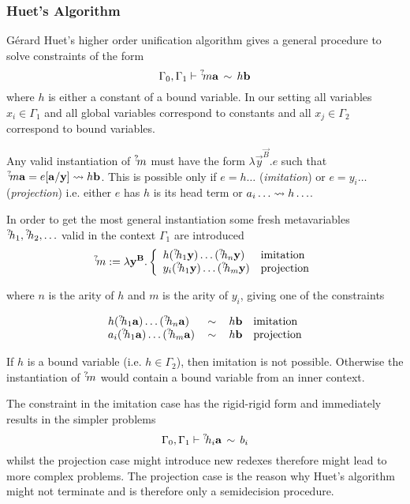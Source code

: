 \subsubsection{Huet's Algorithm}
Gérard Huet's higher order unification algorithm gives a general procedure to
solve constraints of the form
$$
    \Gamma_0, \Gamma_1
    \vdash
    {{}^? \kern-0.2em m} {\mathbf a} \,\sim\, h {\mathbf b}
$$
where $h$ is either a constant of a bound variable. In our setting all variables
$x_i \in \Gamma_1$ and all global variables correspond to constants and all $x_j
\in \Gamma_2$ correspond to bound variables.

Any valid instantiation of ${{}^? \kern-0.2em m}$ must have the form $\lambda \vec y^{\vec
B}. e$ such that ${{}^? \kern-0.2em m} {\mathbf a} = e[{\mathbf a}/{\mathbf y}] \leadsto h {\mathbf b}$. This is
possible only if $e = h \ldots$ (\emph{imitation}) or $e = y_i \ldots$
(\emph{projection}) i.e. either $e$ has $h$ is its head term or $a_i \ldots
\leadsto h \ldots$.

In order to get the most general instantiation some fresh metavariables ${{}^? \kern-0.2em h}_1, {{}^? \kern-0.2em h}_2, \ldots$ valid in the context $\Gamma_1$ are introduced
$$
    {{}^? \kern-0.2em m}
    := \lambda {\mathbf y}^{{\mathbf B}}.
    \left\{ \begin{array}{lllll} 
        h ({{}^? \kern-0.2em h}_1 {\mathbf y}) \ldots ({{}^? \kern-0.2em h}_n {\mathbf y})
        & \text{imitation}
        \\
        y_i ({{}^? \kern-0.2em h}_1 {\mathbf y}) \ldots ({{}^? \kern-0.2em h}_m {\mathbf y})
        & \text{projection}
     \end{array} \right.
$$

where $n$ is the arity of $h$ and $m$ is the arity of $y_i$,
giving one of the constraints

$$
\begin{array}{lllll} 
    h ({{}^? \kern-0.2em h}_1 {\mathbf a}) \ldots ({{}^? \kern-0.2em h}_n {\mathbf a})
    &\,\sim\,&
    h {\mathbf b}
    & \text{imitation}
    \\
    a_i ({{}^? \kern-0.2em h}_1 {\mathbf a}) \ldots ({{}^? \kern-0.2em h}_m {\mathbf a})
    &\,\sim\,&
    h {\mathbf b}
    & \text{projection}
 \end{array}
$$

If $h$ is a bound variable (i.e. $h\in \Gamma_2$), then imitation is not
possible. Otherwise the instantiation of ${{}^? \kern-0.2em m}$ would contain a bound
variable from an inner context.

The constraint in the imitation case has the rigid-rigid form and immediately
results in the simpler problems
$$
    \Gamma_0, \Gamma_1 \vdash {{}^? \kern-0.2em h}_i {\mathbf a} \,\sim\, b_i
$$
whilst the projection case might introduce new redexes therefore might lead to
more complex problems. The projection case is the reason why Huet's algorithm
might not terminate and is therefore only a semidecision procedure.

